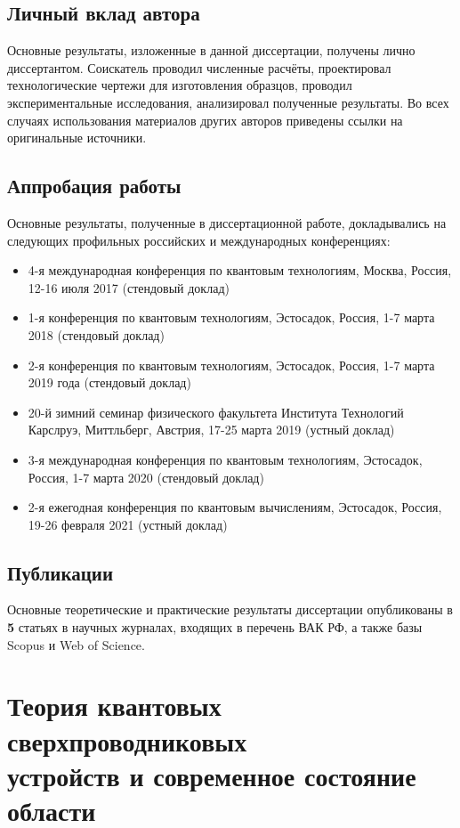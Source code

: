 \documentclass[14pt, a4paper]{extreport}
\numberwithin{equation}{section}
\begin{document}
\section*{Личный вклад автора}

Основные результаты, изложенные в данной диссертации, получены лично диссертантом. Соискатель проводил численные расчёты, проектировал технологические чертежи для изготовления образцов, проводил экспериментальные исследования, анализировал полученные результаты. Во всех случаях использования материалов других авторов приведены ссылки на оригинальные источники.

\section*{Аппробация работы}

Основные результаты, полученные в диссертационной работе, докладывались на следующих профильных российских и международных конференциях:
\begin{itemize}
	\item 4-я международная конференция по квантовым технологиям, Москва, Россия, 12-16 июля 2017 (стендовый доклад)
	\item 1-я конференция по квантовым технологиям, Эстосадок, Россия, 1-7 марта 2018 (стендовый доклад)
	\item 2-я конференция по квантовым технологиям, Эстосадок, Россия, 1-7 марта 2019 года (стендовый доклад)
	\item 20-й зимний семинар физического факультета Института Технологий Карслруэ, Миттльберг, Австрия,  17-25 марта 2019 (устный доклад)
	\item 3-я международная конференция по квантовым технологиям, Эстосадок, Россия, 1-7 марта 2020 (стендовый доклад)
	\item 2-я ежегодная конференция по квантовым вычислениям, Эстосадок, Россия, 19-26 февраля 2021 (устный доклад)
\end{itemize}

\section*{Публикации}

Основные теоретические и практические результаты диссертации
опубликованы в \textbf{5} статьях в научных журналах, входящих в перечень ВАК
РФ, а также базы Scopus и Web of Science.


\chapter{Теория квантовых сверхпроводниковых\\ устройств и современное состояние области}
\end{document}
